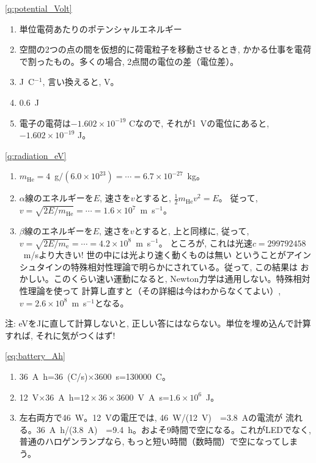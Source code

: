 \ref{q:potential_Volt}　
\begin{enumerate}
\item 単位電荷あたりのポテンシャルエネルギー
\item 空間の2つの点の間を仮想的に荷電粒子を移動させるとき, 
かかる仕事を電荷で割ったもの。多くの場合, 2点間の電位の差（電位差）。
\item J~C$^{-1}$, 言い換えると, V。
\item 0.6~J
\item 電子の電荷は$-1.602\times 10^{-19}$ Cなので, それが1~Vの電位にあると, 
$-1.602\times 10^{-19}$ J。
\end{enumerate}
\mv


\ref{q:radiation_eV}
\begin{enumerate}
\item $m_{\text{He}}=4$~g$/(6.0\times 10^{23})=\cdots=6.7\times 10^{-27}$~kg。
\item $\alpha$線のエネルギーを$E$, 速さを$v$とすると, $\frac{1}{2}m_{\text{He}}v^2=E$。
従って, $v=\sqrt{2E/m_{\text{He}}}=\cdots=1.6\times 10^7$~m~s$^{-1}$。
\item $\beta$線のエネルギーを$E$, 速さを$v$とすると, 上と同様に, 
従って, $v=\sqrt{2E/m_{\text{e}}}=\cdots=4.2\times 10^8$~m~s$^{-1}$。
ところが, これは光速$c=299792458$~m/sより大きい! 世の中には光より速く動くものは無い
ということがアインシュタインの特殊相対性理論で明らかにされている。従って, この結果は
おかしい。このくらい速い運動になると, Newton力学は通用しない。特殊相対性理論を使って
計算し直すと（その詳細は今はわからなくてよい）, $v=2.6\times 10^8$~m~s$^{-1}$となる。
\end{enumerate}
注: eVをJに直して計算しないと, 正しい答にはならない。単位を埋め込んで計算すれば, 
それに気がつくはず!
\mv


\ref{eq:battery_Ah}　
\begin{enumerate}
\item 36~A~h=36~(C/s)$\times$3600~s=130000~C。
\item 12~V$\times$36~A~h=$12\times 36\times 3600$~V~A~s=$1.6\times 10^6$~J。
\item 左右両方で46~W。12~Vの電圧では, 46~W/(12~V)　=3.8~Aの電流が
流れる。36~A~h/(3.8~A)　=9.4~h。およそ9時間で空になる。これがLEDでなく, 
普通のハロゲンランプなら, もっと短い時間（数時間）で空になってしまう。
\end{enumerate}
\mv

